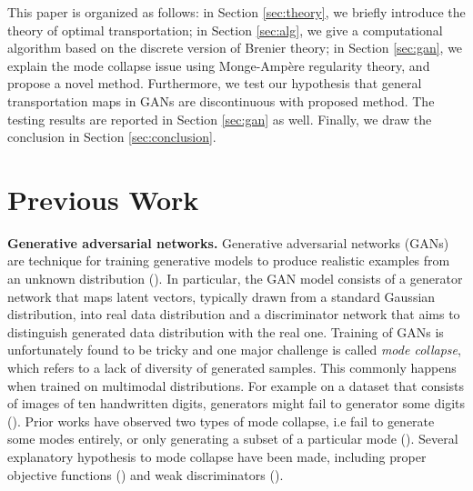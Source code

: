 \documentclass{article}
\begin{document}
This paper is organized as follows: in Section \ref{sec:theory}, we briefly introduce the theory of optimal transportation; in Section \ref{sec:alg}, we give a computational algorithm based on the discrete version of Brenier theory; in Section \ref{sec:gan}, we explain the mode collapse issue using Monge-Amp\`{e}re regularity theory, and propose a novel method. Furthermore, we test our hypothesis that general transportation maps in GANs are discontinuous with proposed method. The testing results are reported in Section \ref{sec:gan} as well. Finally, we draw the conclusion in Section \ref{sec:conclusion}. 



\section{Previous Work}

\textbf{Generative adversarial networks.} Generative adversarial networks (GANs) are technique for training generative models to produce realistic examples from an unknown distribution (\cite{goodfellow2014generative}). In particular, the GAN model consists of a generator network that maps latent vectors, typically drawn from a standard Gaussian distribution, into real data distribution and a discriminator network that aims to distinguish generated data distribution with the real one. Training of GANs is unfortunately found to be tricky and one major challenge is called \textit{mode collapse}, which refers to a lack of diversity of generated samples. This commonly happens when trained on multimodal distributions. For example on a dataset that consists of images of ten handwritten digits, generators might fail to generator some digits (\cite{gulrajani2017improved}).
Prior works have observed two types of mode collapse, i.e fail to generate some modes entirely, or only generating a subset of a particular mode (\cite{goodfellow2016nips, tolstikhin2017adagan, arora2017gans, donahue2016adversarial, metz2016unrolled, reed2016generative}). Several explanatory hypothesis to mode collapse have been made, including proper objective functions (\cite{arjovsky2017wasserstein,arora2017generalization}) and weak discriminators (\cite{metz2016unrolled,salimans2016improved,arora2017generalization,li2017towards}). 
\end{document}
